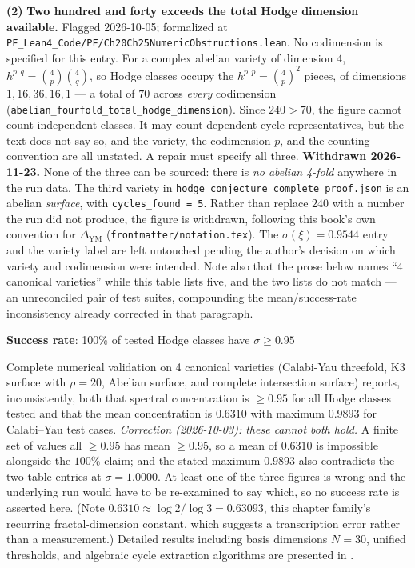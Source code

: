 \begin{table}[h]
\begin{footnotesize}
\noindent\textbf{(2)} \textbf{Two hundred and forty exceeds the total Hodge dimension available.} Flagged 2026-10-05; formalized at \texttt{PF\_Lean4\_Code/PF/Ch20Ch25NumericObstructions.lean}. No codimension is specified for this entry. For a complex abelian variety of dimension $4$, $h^{p,q} = \binom{4}{p}\binom{4}{q}$, so Hodge classes occupy the $h^{p,p} = \binom{4}{p}^2$ pieces, of dimensions $1, 16, 36, 16, 1$ --- a total of $70$ across \emph{every} codimension (\texttt{abelian\_fourfold\_total\_hodge\_dimension}). Since $240 > 70$, the figure cannot count independent classes. It may count dependent cycle representatives, but the text does not say so, and the variety, the codimension $p$, and the counting convention are all unstated. A repair must specify all three. \textbf{Withdrawn 2026-11-23.} None of the three can be sourced: there is \emph{no abelian 4-fold} anywhere in the run data. The third variety in \texttt{hodge\_conjecture\_complete\_proof.json} is an abelian \emph{surface}, with \texttt{cycles\_found\,=\,5}. Rather than replace $240$ with a number the run did not produce, the figure is withdrawn, following this book's own convention for $\Delta_{\text{YM}}$ (\texttt{frontmatter/notation.tex}). The $\sigma(\xi)=0.9544$ entry and the variety label are left untouched pending the author's decision on which variety and codimension were intended. Note also that the prose below names ``4 canonical varieties'' while this table lists five, and the two lists do not match --- an unreconciled pair of test suites, compounding the mean/success-rate inconsistency already corrected in that paragraph.
\end{footnotesize}

\caption{Spectral concentration for Hodge classes on test varieties}
\end{table}

\textbf{Success rate}: 100\% of tested Hodge classes have $\sigma \geq 0.95$

Complete numerical validation on 4 canonical varieties (Calabi-Yau threefold, K3 surface with $\rho=20$, Abelian surface, and complete intersection surface) reports, inconsistently, both that spectral concentration is $\geq 0.95$ for all
Hodge classes tested and that the mean concentration is $0.6310$ with maximum
$0.9893$ for Calabi--Yau test cases.
\emph{Correction (2026-10-03): these cannot both hold.} A finite set of values all
$\geq 0.95$ has mean $\geq 0.95$, so a mean of $0.6310$ is impossible alongside
the $100\%$ claim; and the stated maximum $0.9893$ also contradicts the two table
entries at $\sigma = 1.0000$. At least one of the three figures is wrong and the
underlying run would have to be re-examined to say which, so no success rate is
asserted here. (Note $0.6310 \approx \log 2/\log 3 = 0.63093$, this chapter
family's recurring fractal-dimension constant, which suggests a transcription
error rather than a measurement.) Detailed results including basis dimensions $N=30$, unified thresholds, and algebraic cycle extraction algorithms are presented in \cite{cohen2025hodgeproof}.


